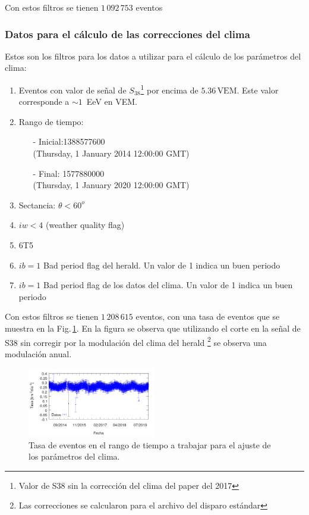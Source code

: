 Con estos filtros se tienen $1\,092\,753$ eventos

\subsubsection{Datos para el cálculo de las correcciones del clima}

Estos son los filtros para los datos a utilizar para el cálculo de los parámetros del clima:

\begin{enumerate}
	\item Eventos con valor de señal de $S_{38}$\footnote{Valor de S38 sin la corrección del clima del paper del 2017} por encima de  $5.36\,\text{VEM}$. Este valor corresponde a $\sim 1\,$ EeV  en VEM.
	\item Rango de tiempo:
	\begin{itemize}
		\item[-] Inicial:1388577600 \\ (Thursday, 1 January 2014 12:00:00 GMT)
		\item[-] Final: 1577880000  \\ (Thursday, 1 January 2020 12:00:00 GMT)
	\end{itemize}
	\item Sectancia:  $\theta < 60^o$
	\item $iw<4$ (weather quality flag)
	\item 6T5
	\item $ib=1$ Bad period flag del herald.  Un valor de 1 indica un buen periodo
	\item $ib=1$ Bad period flag de los datos del clima. Un valor de 1 indica un buen periodo
\end{enumerate}


Con estos filtros se tienen $1\,208\,615$ eventos, con una tasa de eventos que se muestra en la Fig.\,\ref{tasa_total_diaria_ajuste_weather}. En la figura se observa que utilizando el corte en la señal de S38 sin corregir por la modulación del clima del herald \footnote{Las correcciones se calcularon para el archivo del disparo estándar} se observa una modulación anual.

\begin{figure}[H]
	\centering
	\includegraphics[width=0.5\textwidth]{rate_total_ajuste_weather.png}
	\caption{Tasa  de eventos en el rango de tiempo a trabajar para el ajuste de los parámetros del clima.}
	\label{tasa_total_diaria_ajuste_weather}
\end{figure}


